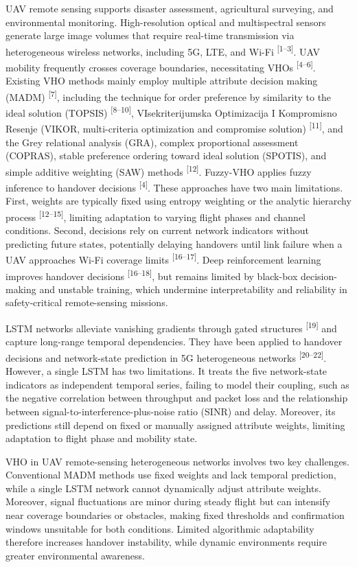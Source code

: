 \documentclass[10pt,a4paper]{article}
\newcommand{\upcite}[1]{\textsuperscript{[#1]}}
\begin{document}
UAV remote sensing supports disaster assessment, agricultural surveying, and environmental monitoring. High-resolution optical and multispectral sensors generate large image volumes that require real-time transmission via heterogeneous wireless networks, including 5G, LTE, and Wi-Fi \upcite{1--3}. UAV mobility frequently crosses coverage boundaries, necessitating VHOs \upcite{4--6}. Existing VHO methods mainly employ multiple attribute decision making (MADM) \upcite{7}, including the technique for order preference by similarity to the ideal solution (TOPSIS) \upcite{8--10}, VIsekriterijumska Optimizacija I Kompromisno Resenje (VIKOR, multi-criteria optimization and compromise solution) \upcite{11}, and the Grey relational analysis (GRA), complex proportional assessment (COPRAS), stable preference ordering toward ideal solution (SPOTIS), and simple additive weighting (SAW) methods \upcite{12}. Fuzzy-VHO applies fuzzy inference to handover decisions \upcite{4}. These approaches have two main limitations. First, weights are typically fixed using entropy weighting or the analytic hierarchy process \upcite{12--15}, limiting adaptation to varying flight phases and channel conditions. Second, decisions rely on current network indicators without predicting future states, potentially delaying handovers until link failure when a UAV approaches Wi-Fi coverage limits \upcite{16--17}. Deep reinforcement learning improves handover decisions \upcite{16--18}, but remains limited by black-box decision-making and unstable training, which undermine interpretability and reliability in safety-critical remote-sensing missions.

LSTM networks alleviate vanishing gradients through gated structures \upcite{19} and capture long-range temporal dependencies. They have been applied to handover decisions and network-state prediction in 5G heterogeneous networks \upcite{20--22}. However, a single LSTM has two limitations. It treats the five network-state indicators as independent temporal series, failing to model their coupling, such as the negative correlation between throughput and packet loss and the relationship between signal-to-interference-plus-noise ratio (SINR) and delay. Moreover, its predictions still depend on fixed or manually assigned attribute weights, limiting adaptation to flight phase and mobility state.

VHO in UAV remote-sensing heterogeneous networks involves two key challenges. Conventional MADM methods use fixed weights and lack temporal prediction, while a single LSTM network cannot dynamically adjust attribute weights. Moreover, signal fluctuations are minor during steady flight but can intensify near coverage boundaries or obstacles, making fixed thresholds and confirmation windows unsuitable for both conditions. Limited algorithmic adaptability therefore increases handover instability, while dynamic environments require greater environmental awareness.
\end{document}
